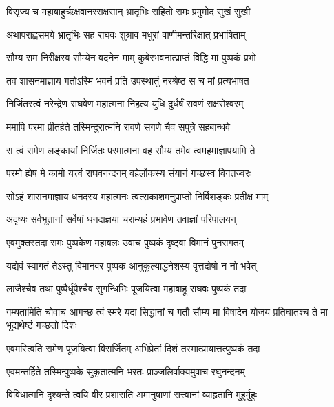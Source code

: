 
\twolineshloka
{विसृज्य च महाबाहुर्ऋक्षवानरराक्षसान्}
{भ्रातृभिः सहितो रामः प्रमुमोद सुखं सुखी} %

\twolineshloka
{अथापराह्णसमये भ्रातृभिः सह राघवः}
{शुश्राव मधुरां वाणीमन्तरिक्षात् प्रभाषिताम्} %

\twolineshloka
{सौम्य राम निरीक्षस्व सौम्येन वदनेन माम्}
{कुबेरभवनात्प्राप्तं विद्धि मां पुष्पकं प्रभो} %

\twolineshloka
{तव शासनमाज्ञाय गतोऽस्मि भवनं प्रति}
{उपस्थातुं नरश्रेष्ठ स च मां प्रत्यभाषत} %

\twolineshloka
{निर्जितस्त्वं नरेन्द्रेण राघवेण महात्मना}
{निहत्य युधि दुर्धर्षं रावणं राक्षसेश्वरम्} %

\twolineshloka
{ममापि परमा प्रीतर्हते तस्मिन्दुरात्मनि}
{रावणे सगणे चैव सपुत्रे सहबान्धवे} %

\twolineshloka
{स त्वं रामेण लङ्कायां निर्जितः परमात्मना}
{वह सौम्य तमेव त्वमहमाज्ञापयामि ते} %

\twolineshloka
{परमो ह्येष मे कामो यत्त्वं राघवनन्दनम्}
{वहेर्लोकस्य संयानं गच्छस्व विगतज्वरः} %

\twolineshloka
{सोऽहं शासनमाज्ञाय धनदस्य महात्मनः}
{त्वत्सकाशमनुप्राप्तो निर्विशङ्कः प्रतीक्ष माम्} %

\twolineshloka
{अदृष्यः सर्वभूतानां सर्वेषां धनदाज्ञया}
{चराम्यहं प्रभावेण तवाज्ञां परिपालयन्} %

\twolineshloka
{एवमुक्तस्तदा रामः पुष्पकेण महाबलः}
{उवाच पुष्पकं दृष्ट्वा विमानं पुनरागतम्} %

\twolineshloka
{यद्येवं स्वागतं तेऽस्तु विमानवर पुष्पक}
{आनुकूल्याद्धनेशस्य वृत्तदोषो न नो भवेत्} %

\twolineshloka
{लाजैश्चैव तथा पुष्पैर्धूपैश्चैव सुगन्धिभिः}
{पूजयित्वा महाबाहू राघवः पुष्पकं तदा} %

\threelineshloka
{गम्यतामिति चोवाच आगच्छ त्वं स्मरे यदा}
{सिद्धानां च गतौ सौम्य मा विषादेन योजय}
{प्रतिघातश्च ते मा भूद्यथेष्टं गच्छतो दिशः} %

\twolineshloka
{एवमस्त्विति रामेण पूजयित्वा विसर्जितम्}
{अभिप्रेतां दिशं तस्मात्प्रायात्तत्पुष्पकं तदा} %

\twolineshloka
{एवमन्तर्हिते तस्मिन्पुष्पके सुकृतात्मनि}
{भरतः प्राञ्जलिर्वाक्यमुवाच रघुनन्दनम्} %

\twolineshloka
{विविधात्मनि दृश्यन्ते त्वयि वीर प्रशासति}
{अमानुषाणां सत्त्वानां व्याहृतानि मुहुर्मुहुः} %

